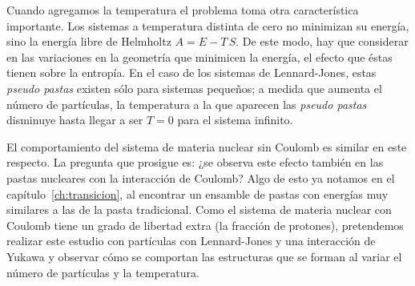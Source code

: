 Cuando agregamos la temperatura el problema toma otra característica importante.
Los sistemas a temperatura distinta de cero no minimizan su energía, sino la energía libre de Helmholtz $A = E - T\,S$.
De este modo, hay que considerar en las variaciones en la geometría que minimicen la energía, el efecto que éstas tienen sobre la entropía.
En el caso de los sistemas de Lennard-Jones, estas \emph{pseudo pastas} existen sólo para sistemas pequeños; a medida que aumenta el número de partículas, la temperatura a la que aparecen las \emph{pseudo pastas} disminuye hasta llegar a ser $T=0$ para el sistema infinito.

El comportamiento del sistema de materia nuclear sin Coulomb es similar en este respecto.
La pregunta que prosigue es: ¿se observa este efecto también en las pastas nucleares con la interacción de Coulomb?
Algo de esto ya notamos en el capítulo~\ref{ch:transicion}, al encontrar un ensamble de pastas con energías muy similares a las de la pasta tradicional.
Como el sistema de materia nuclear con Coulomb tiene un grado de libertad extra (la fracción de protones), pretendemos realizar este estudio con partículas con Lennard-Jones y una interacción de Yukawa y observar cómo se comportan las estructuras que se forman al variar el número de partículas y la temperatura.
